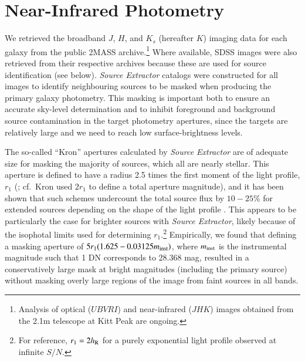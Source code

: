 \documentclass[traditabstract]{aa} %
\begin{document}


\section{Near-Infrared Photometry}
\label{sec:2MASSphot}

We retrieved the broadband $J$, $H$, and $K_s$ (hereafter $K$) imaging data for
each galaxy from the public 2MASS archive.\footnote{
%
Analysis of optical ($UBVRI$) and near-infrared ($JHK$) images obtained from the
2.1m telescope at Kitt Peak  are ongoing.
%
}
%
Where available, SDSS images were also retrieved from their respective archives
because these are used for source identification (see below). {\it Source
Extractor} \citep{Bertin1996} catalogs were constructed for all images to
identify neighbouring sources to be masked when producing the primary galaxy
photometry.  This masking is important both to ensure an accurate sky-level
determination and to inhibit foreground and background source contamination in
the target photometry apertures, since the targets are relatively large and we
need to reach low surface-brightness levels.
 
The so-called ``Kron'' apertures calculated by {\it Source Extractor} are of
adequate size for masking the majority of sources, which all are nearly stellar.
This aperture is defined to have a radius 2.5 times the first moment
of the light profile, $r_1$ (\citealt{kron1980}; cf.~Kron used $2r_1$ to define
a total aperture magnitude), and it has been shown that such schemes undercount
the total source flux by $10-25$\% for extended sources depending on the shape
of the light profile \citep{bershady1994}.  This appears to be particularly the
case for brighter sources with {\it Source Extractor}, likely because of the
isophotal limits used for determining $r_1$.\footnote{
%
For reference, $r_1 = 2 h_{\rm R}$ for a purely exponential light profile observed at
infinite $S/N$. 
%
}  Empirically, we found that defining a masking aperture of $5 r_1 (1.625 -
0.03125 m_{\rm inst})$, where $m_{\rm inst}$ is the instrumental magnitude such
that 1 DN corresponds to 28.368 mag, resulted in a conservatively large mask at
bright magnitudes (including the primary source) without masking overly large
regions of the image from faint sources in all bands.
\end{document}
